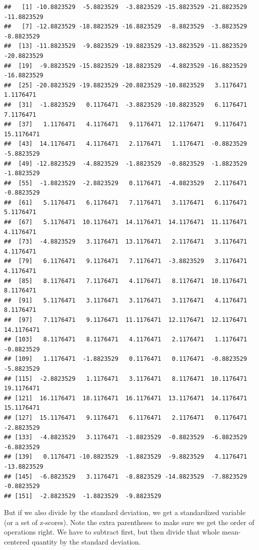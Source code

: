 \documentclass[
]{book}
\newenvironment{Shaded}{\begin{snugshade}}{\end{snugshade}}
\newcommand{\FunctionTok}[1]{\textcolor[rgb]{0.00,0.00,0.00}{#1}}
\newcommand{\NormalTok}[1]{#1}
\newcommand{\SpecialCharTok}[1]{\textcolor[rgb]{0.00,0.00,0.00}{#1}}
\begin{document}
\begin{verbatim}
##   [1] -10.8823529  -5.8823529  -3.8823529 -15.8823529 -21.8823529 -11.8823529
##   [7] -12.8823529 -18.8823529 -16.8823529  -8.8823529  -3.8823529  -8.8823529
##  [13] -11.8823529  -9.8823529 -19.8823529 -13.8823529 -11.8823529 -20.8823529
##  [19]  -9.8823529 -15.8823529 -18.8823529  -4.8823529 -16.8823529 -16.8823529
##  [25] -20.8823529 -19.8823529 -20.8823529 -10.8823529   3.1176471   1.1176471
##  [31]  -1.8823529   0.1176471  -3.8823529 -10.8823529   6.1176471   7.1176471
##  [37]   1.1176471   4.1176471   9.1176471  12.1176471   9.1176471  15.1176471
##  [43]  14.1176471   4.1176471   2.1176471   1.1176471  -0.8823529  -5.8823529
##  [49] -12.8823529  -4.8823529  -1.8823529  -0.8823529  -1.8823529  -1.8823529
##  [55]  -1.8823529  -2.8823529   0.1176471  -4.8823529   2.1176471  -0.8823529
##  [61]   5.1176471   6.1176471   7.1176471   3.1176471   6.1176471   5.1176471
##  [67]   5.1176471  10.1176471  14.1176471  14.1176471  11.1176471   4.1176471
##  [73]  -4.8823529   3.1176471  13.1176471   2.1176471   3.1176471   4.1176471
##  [79]   6.1176471   9.1176471   7.1176471  -3.8823529   3.1176471   4.1176471
##  [85]   8.1176471   7.1176471   4.1176471   8.1176471  10.1176471   8.1176471
##  [91]   5.1176471   3.1176471   3.1176471   3.1176471   4.1176471   8.1176471
##  [97]   7.1176471   9.1176471  11.1176471  12.1176471  12.1176471  14.1176471
## [103]   8.1176471   8.1176471   4.1176471   2.1176471   1.1176471  -0.8823529
## [109]   1.1176471  -1.8823529   0.1176471   0.1176471  -0.8823529  -5.8823529
## [115]  -2.8823529   1.1176471   3.1176471   8.1176471  10.1176471  19.1176471
## [121]  16.1176471  18.1176471  16.1176471  13.1176471  14.1176471  15.1176471
## [127]  15.1176471   9.1176471   6.1176471   2.1176471   0.1176471  -2.8823529
## [133]  -4.8823529   3.1176471  -1.8823529  -0.8823529  -6.8823529  -6.8823529
## [139]   0.1176471 -10.8823529  -1.8823529  -9.8823529   4.1176471 -13.8823529
## [145]  -6.8823529   3.1176471  -8.8823529 -14.8823529  -7.8823529  -0.8823529
## [151]  -2.8823529  -1.8823529  -9.8823529
\end{verbatim}

But if we also divide by the standard deviation, we get a standardized variable (or a set of z-scores). Note the extra parentheses to make sure we get the order of operations right. We have to subtract first, but then divide that whole mean-centered quantity by the standard deviation.

\begin{Shaded}
\end{Shaded}
\end{document}
